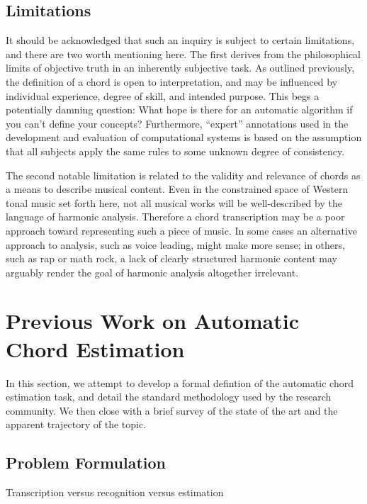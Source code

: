 \subsection{Limitations}
\label{sec:limitations}
It should be acknowledged that such an inquiry is subject to certain limitations, and there are two worth mentioning here.
The first derives from the philosophical limits of objective truth in an inherently subjective task.
As outlined previously, the definition of a chord is open to interpretation, and may be influenced by individual experience, degree of skill, and intended purpose.
This begs a potentially damning question: What hope is there for an automatic algorithm if you can't define your concepts?
Furthermore, ``expert'' annotations used in the development and evaluation of computational systems is based on the assumption that all subjects apply the same rules to some unknown degree of consistency.

The second notable limitation is related to the validity and relevance of chords as a means to describe musical content.
Even in the constrained space of Western tonal music set forth here, not all musical works will be well-described by the language of harmonic analysis.
Therefore a chord transcription may be a poor approach toward representing such a piece of music.
In some cases an alternative approach to analysis, such as voice leading, might make more sense; in others, such as rap or math rock, a lack of clearly structured harmonic content may arguably render the goal of harmonic analysis altogether irrelevant.


\section{Previous Work on Automatic Chord Estimation}
\label{sec:background}

In this section, we attempt to develop a formal defintion of the automatic chord estimation task, and detail the standard methodology used by the research community.
We then close with a brief survey of the state of the art and the apparent trajectory of the topic.


\subsection{Problem Formulation}
\label{subsec:problem_formulation}

Transcription versus recognition versus estimation

